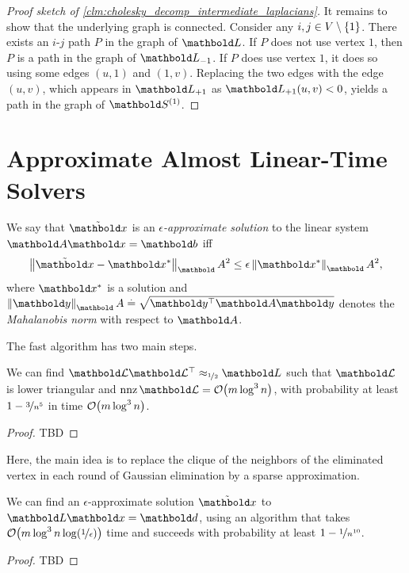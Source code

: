 \begin{proof}[Proof sketch of \cref{clm:cholesky_decomp_intermediate_laplacians}]
It remains to show that the underlying graph is connected. Consider any $i,j \in V \setminus \{1\}$. There exists an $i$-$j$ path $P$ in the graph of $\mL$. If $P$ does not use vertex $1$, then $P$ is a path in the graph of $\mL_{-1}$. If $P$ does use vertex $1$, it does so using some edges $(u,1)$ and $(1,v)$. Replacing the two edges with the edge $(u,v)$, which appears in $\mL_{+1}$ as $\mL_{+1}(u,v) < 0$, yields a path in the graph of $\mS^{(1)}$.
\end{proof}

\section{Approximate Almost Linear-Time Solvers}

\begin{defn} We say that $\Tilde{\vx}$ is an \emph{$\epsilon$-approximate solution} to the linear system $\mA\vx = \vb$ iff \begin{align}
    \norm{\Tilde{\vx} - \s{\vx}}_\mA^2 \leq \epsilon \norm{\s{\vx}}_\mA^2,
\end{align} where $\s{\vx}$ is a solution and $\norm{\vy}_\mA \defeq \sqrt{\trans{\vy}\mA\vy}$ denotes the \emph{Mahalanobis norm} with respect to $\mA$.
\end{defn}

The fast algorithm has two main steps.

\begin{thm} We can find $\mCalL\trans{\mCalL} \approx_{\nicefrac{1}{2}} \mL$ such that $\mCalL$ is lower triangular and $\nnz{\mCalL} = \LandauO{m \log^3 n}$, with probability at least $1 - \nicefrac{3}{n^5}$ in time $\LandauO{m \log^3 n}$.\cite{kyng2016approximate}
\end{thm}
\begin{proof}
TBD
\end{proof}

Here, the main idea is to replace the clique of the neighbors of the eliminated vertex in each round of Gaussian elimination by a sparse approximation.

\begin{thm} We can find an $\epsilon$-approximate solution $\Tilde{\vx}$ to $\mL\vx = \vd$, using an algorithm that takes $\LandauO{m \log^3 n \log(\nicefrac{1}{\epsilon})}$ time and succeeds with probability at least $1 - \nicefrac{1}{n^{10}}$.
\end{thm}
\begin{proof}
TBD
\end{proof}